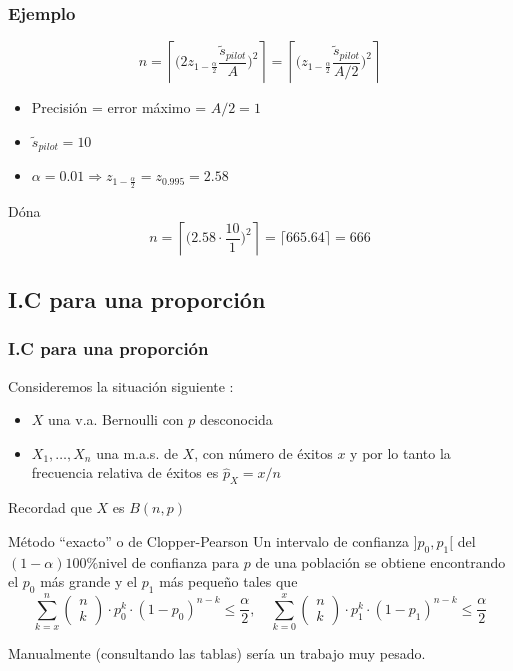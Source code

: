 \documentclass[12pt,t]{beamer}
\renewcommand{\leq}{\leqslant}
\theoremstyle{plain}
\theoremstyle{definition}
\begin{document}
\begin{frame}
\frametitle{Ejemplo}

$$
n=
\left\lceil \Big(2z_{1-\frac{\alpha}{2}}\frac{\widetilde{s}_{pilot}}{A}\Big)^2\right\rceil=
\left\lceil \Big(z_{1-\frac{\alpha}{2}}\frac{\widetilde{s}_{pilot}}{A/2}\Big)^2\right\rceil
$$

\begin{itemize}
\item Precisión = error máximo = ${A}/{2}=1$
\medskip

\item $\widetilde{s}_{pilot}=10$
\medskip

\item $\alpha=0.01\Rightarrow z_{1-\frac{\alpha}{2}}=z_{0.995}=2.58$
\end{itemize}
Dóna
$$
n=\left\lceil \Big(2.58\cdot \frac{10}{1}\Big)^2\right\rceil=\lceil 665.64\rceil=666
$$

\end{frame}



\subsection{I.C para una proporción }


\begin{frame}
\frametitle{I.C para una proporción}

Consideremos la situación siguiente  :
\begin{itemize}
\item  $X$ una v.a. Bernoulli con $p$ desconocida

\item $X_1,\ldots,X_n$ una m.a.s. de $X$, con número de éxitos  $x$ y por lo tanto la frecuencia relativa de éxitos  es $\widehat{p}_{X}=x/n$
\end{itemize}

Recordad que $X$ es $B(n,p)$
\scriptsize{
\begin{block}{Método ``exacto'' o de Clopper-Pearson}
Un intervalo de confianza  $]p_0,p_1[$ del $(1-\alpha)100\%$nivel de confianza para $p$ de una población se obtiene encontrando el $p_0$ más grande y el $p_1$ más pequeño tales que
$$
\displaystyle\sum_{k=x}^n 
\left(\begin{array}{c} n \\ k\end{array}\right)
\cdot p_0^k\cdot (1-p_0)^{n-k}\leq \frac{\alpha}{2},\quad
\displaystyle\sum_{k=0}^x \left(\begin{array}{c} n \\ k\end{array}\right)\cdot p_1^k\cdot(1-p_1)^{n-k}\leq \frac{\alpha}{2}
$$
\end{block}
Manualmente (consultando las tablas) sería un trabajo muy pesado.
}
\end{frame}
\end{document}
